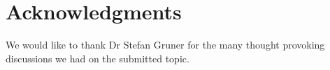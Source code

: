 \section{Acknowledgments}
\label{sec:acknowledgements}
We would like to thank Dr Stefan Gruner for the many thought provoking discussions we had on the submitted topic.
